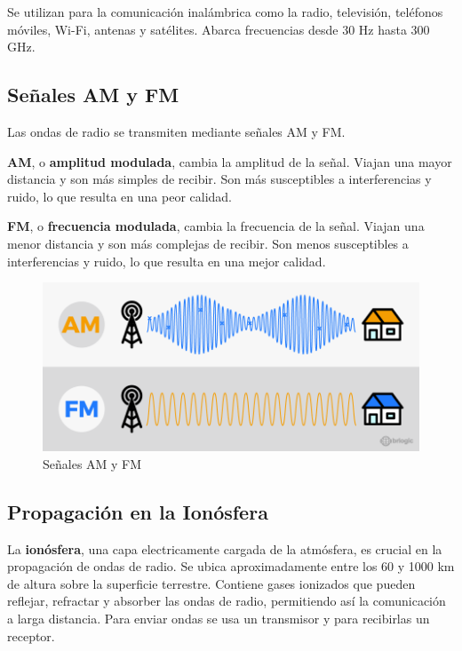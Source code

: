Se utilizan para la comunicación inalámbrica como la radio, televisión, teléfonos móviles, Wi-Fi, antenas y satélites. Abarca frecuencias desde 30 Hz hasta 300 GHz.

\subsection{Señales AM y FM}

Las ondas de radio se transmiten mediante señales AM y FM.

\textbf{AM}, o \textbf{amplitud modulada}, cambia la amplitud de la señal. Viajan una mayor distancia y son más simples de recibir. Son más susceptibles a interferencias y ruido, lo que resulta en una peor calidad.

\textbf{FM}, o \textbf{frecuencia modulada}, cambia la frecuencia de la señal. Viajan una menor distancia y son más complejas de recibir. Son menos susceptibles a interferencias y ruido, lo que resulta en una mejor calidad.

\begin{figure}[H]
  \centering
  \includegraphics[scale=0.4]{imagenes/am_fm.png}
  \caption{Señales AM y FM\cite{brlogicamfm}}
\end{figure}

\subsection{Propagación en la Ionósfera}

La \textbf{ionósfera}, una capa electricamente cargada de la atmósfera, es crucial en la propagación de ondas de radio. Se ubica aproximadamente entre los 60 y 1000 km de altura sobre la superficie terrestre. Contiene gases ionizados que pueden reflejar, refractar y absorber las ondas de radio, permitiendo así la comunicación a larga distancia. Para enviar ondas se usa un transmisor y para recibirlas un receptor.

